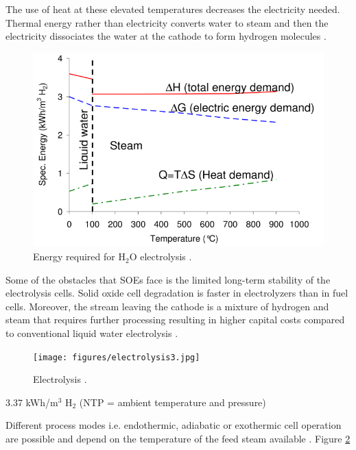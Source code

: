 \documentclass[11pt,letterpaper]{article}
\begin{document}
The use of heat at these elevated temperatures decreases the electricity needed.
Thermal energy rather than electricity converts water to steam and then the electricity dissociates the water at the cathode to form hydrogen molecules \cite{xu_introduction_2017}.

\begin{figure}[] %
	\centering
	\includegraphics[width=0.6\linewidth]{figures/electrolysis2.png}
	\hfill
	\caption{Energy required for H$_2$O electrolysis \cite{helmeth_high_2020}.}
	\label{fig:nf2}
\end{figure}


Some of the obstacles that \glspl{SOE} face is the limited long-term stability of the electrolysis cells. Solid oxide cell degradation is faster in electrolyzers than in fuel cells. Moreover, the stream leaving the cathode is a mixture of hydrogen and steam that requires further processing resulting in higher capital costs compared to conventional liquid water electrolysis \cite{ursua_hydrogen_2012}.

\begin{figure}[] %
	\centering
	\texttt{[image: figures/electrolysis3.jpg]}
	\hfill
	\caption{ Electrolysis \cite{doenitz_concepts_1982}.}
	\label{fig:electro3}
\end{figure}

3.37 kWh/m$^3$ H$_2$ (NTP = ambient temperature and pressure)
\cite{helmeth_high_2020}

Different process modes i.e. endothermic, adiabatic or exothermic cell operation are possible and depend on the temperature of the feed steam available \cite{doenitz_concepts_1982}. Figure \ref{fig:electro3}

\pagebreak


\end{document}
